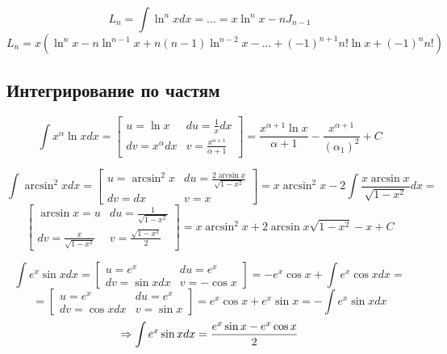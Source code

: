 \documentclass[main]{subfiles}
\begin{document}
    \begin{Example}
        \[L_n = \int \ln^n x dx = ... = x \ln^n x - n J_{n-1}\]
        \[L_n = x (\ln^n x - n \ln^{n-1} x + n(n-1) \ln^{n-2} x - ... + (-1)^{n+1} n! \ln x  +(-1)^n n!)\]
    \end{Example}

    \newpage
    \subsection{Интегрирование по частям}
    \begin{Example}
        \[\int x^{\alpha} \ln x dx = \left[\begin{matrix}
            u = \ln x & du = \frac{1}{x} dx\\
            dv = x^{\alpha} dx & v = \frac{x^{\alpha + 1}}{\alpha + 1}
        \end{matrix}\right] = \frac{x^{\alpha+1}\ln x}{\alpha+1} - \frac{x^{\alpha +1}}{(\alpha_1)^2} + C\]
    \end{Example}

    \begin{Example}
        \[\int \arcsin^2 x dx = \left[\begin{matrix}
            u = \arcsin^2 x & du = \frac{2 \arcsin x}{\sqrt{1-x^2}}\\
            dv = dx & v = x
        \end{matrix}\right] = x \arcsin^2 x - 2 \int \frac{x \arcsin x}{\sqrt{1-x^2}} dx =\]
        \[\left[\begin{matrix}
            \arcsin x = u & du = \frac{1}{\sqrt{1-x^2}}\\
            dv = \frac{x}{\sqrt{1-x^2}} & v = \frac{\sqrt{1-x^2}}{2}
        \end{matrix}\right] = x \arcsin^2 x + 2 \arcsin x \sqrt{1-x^2} - x + C\]
    \end{Example}

    \begin{Example}
        \[\int e^x \sin x dx = \left[\begin{matrix}
            u = e^x & du = e^x\\
            dv = \sin x dx & v = -\cos x
        \end{matrix}\right] = -e^x \cos x + \int e^x \cos x dx =\]
        \[= \left[\begin{matrix}
            u = e^x & du = e^x\\
            dv = \cos x dx & v = \sin x
        \end{matrix}\right] = e^x \cos x + e^x \sin x = - \int e^x \sin x dx\]
        \[\Rightarrow \int e^x \sin x dx = \frac{e^x \sin x - e^x \cos x}{2}\]
    \end{Example}
\end{document}

